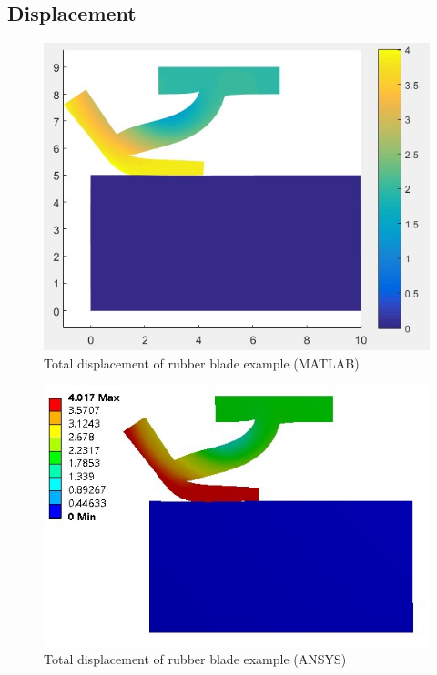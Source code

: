 \subsection{Displacement}
\begin{figure}[H]
    \centering
    \includegraphics[scale=0.8]{Figures/dt_rub_mat.jpg}
    \decoRule
    \caption{Total displacement of rubber blade example (MATLAB)}
    \label{fig:dt_rub_mat}
\end{figure} \noindent
\begin{figure}[H]
    \centering
    \includegraphics[scale=1]{Figures/dt_rub_an.jpg}
    \decoRule
    \caption{Total displacement of rubber blade example (ANSYS)}
    \label{fig:dt_rub_an}
\end{figure} \noindent
